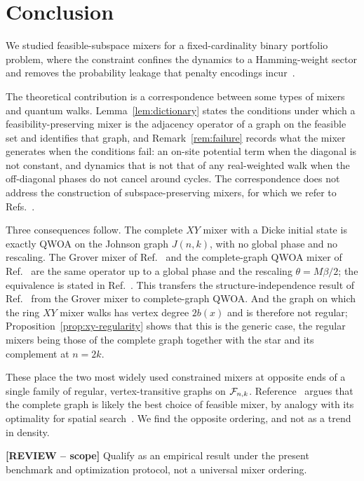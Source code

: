 \section{\label{sec:conclusion}Conclusion}

We studied feasible-subspace mixers for a fixed-cardinality binary portfolio
problem, where the constraint confines the dynamics to a Hamming-weight sector
and removes the probability leakage that penalty encodings
incur~\cite{Hadfield2019,Slate2021}.

The theoretical contribution is a correspondence between some types of mixers and quantum walks. Lemma~\ref{lem:dictionary} states
the conditions under which a feasibility-preserving mixer is the adjacency
operator of a graph on the feasible set and identifies that graph, and
Remark~\ref{rem:failure} records what the mixer generates when the conditions
fail: an on-site potential term when the diagonal is not constant, and
dynamics that is not that of any real-weighted walk when the off-diagonal
phases do not cancel around cycles. The correspondence does not address the
construction of subspace-preserving mixers, for which we refer to
Refs.~\cite{Fuchs2022,Fuchs2024}.

Three consequences follow. The complete $XY$ mixer with a Dicke initial state
is exactly QWOA on the Johnson graph $J(n,k)$, with no global phase and no
rescaling. The Grover mixer of Ref.~\cite{Bartschi2020} and the
complete-graph QWOA mixer of Ref.~\cite{Slate2021} are the same operator up to
a global phase and the rescaling $\theta=M\beta/2$; the equivalence is stated
in Ref.~\cite{Bridi2024}. This transfers the
structure-independence result of Ref.~\cite{Bridi2024} from the Grover mixer
to complete-graph QWOA. And the graph on which the ring $XY$ mixer walks has
vertex degree $2b(x)$ and is therefore not regular;
Proposition~\ref{prop:xy-regularity} shows that this is the generic case, the
regular mixers being those of the complete graph together with the star and
its complement at $n=2k$.

These place the two most widely used constrained mixers at opposite ends of
a single family of regular, vertex-transitive graphs on $\mathcal{F}_{n,k}$.
Reference~\cite{Slate2021} argues that the complete graph is likely the
best choice of feasible mixer, by analogy with its optimality for spatial
search~\cite{Zalka1999,Childs2004,Roland2003}. We find the opposite
ordering, and not as a trend in density.

{\color{red}\textbf{[REVIEW -- scope]} Qualify as an empirical result under the present benchmark and optimization protocol, not a universal mixer ordering.}

